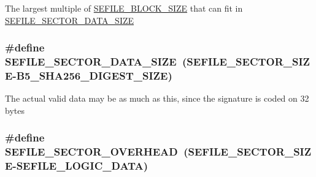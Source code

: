 The largest multiple of \hyperlink{group___sector___defines_ga9344350dc20df5bbdc5693775c54afcb}{S\-E\-F\-I\-L\-E\-\_\-\-B\-L\-O\-C\-K\-\_\-\-S\-I\-Z\-E} that can fit in \hyperlink{group___sector___defines_ga6961ed45e472749b587136d18eb74b4d}{S\-E\-F\-I\-L\-E\-\_\-\-S\-E\-C\-T\-O\-R\-\_\-\-D\-A\-T\-A\-\_\-\-S\-I\-Z\-E} \hypertarget{group___sector___defines_ga6961ed45e472749b587136d18eb74b4d}{
\subsubsection[{S\-E\-F\-I\-L\-E\-\_\-\-S\-E\-C\-T\-O\-R\-\_\-\-D\-A\-T\-A\-\_\-\-S\-I\-Z\-E}]{\setlength{\rightskip}{0pt plus 5cm}\#define S\-E\-F\-I\-L\-E\-\_\-\-S\-E\-C\-T\-O\-R\-\_\-\-D\-A\-T\-A\-\_\-\-S\-I\-Z\-E~({\bf S\-E\-F\-I\-L\-E\-\_\-\-S\-E\-C\-T\-O\-R\-\_\-\-S\-I\-Z\-E}-\/B5\-\_\-\-S\-H\-A256\-\_\-\-D\-I\-G\-E\-S\-T\-\_\-\-S\-I\-Z\-E)}}\label{group___sector___defines_ga6961ed45e472749b587136d18eb74b4d}
The actual valid data may be as much as this, since the signature is coded on 32 bytes \hypertarget{group___sector___defines_ga70a387176632325441aebca4839e19fc}{
\subsubsection[{S\-E\-F\-I\-L\-E\-\_\-\-S\-E\-C\-T\-O\-R\-\_\-\-O\-V\-E\-R\-H\-E\-A\-D}]{\setlength{\rightskip}{0pt plus 5cm}\#define S\-E\-F\-I\-L\-E\-\_\-\-S\-E\-C\-T\-O\-R\-\_\-\-O\-V\-E\-R\-H\-E\-A\-D~({\bf S\-E\-F\-I\-L\-E\-\_\-\-S\-E\-C\-T\-O\-R\-\_\-\-S\-I\-Z\-E}-\/{\bf S\-E\-F\-I\-L\-E\-\_\-\-L\-O\-G\-I\-C\-\_\-\-D\-A\-T\-A})}}\label{group___sector___defines_ga70a387176632325441aebca4839e19fc}
